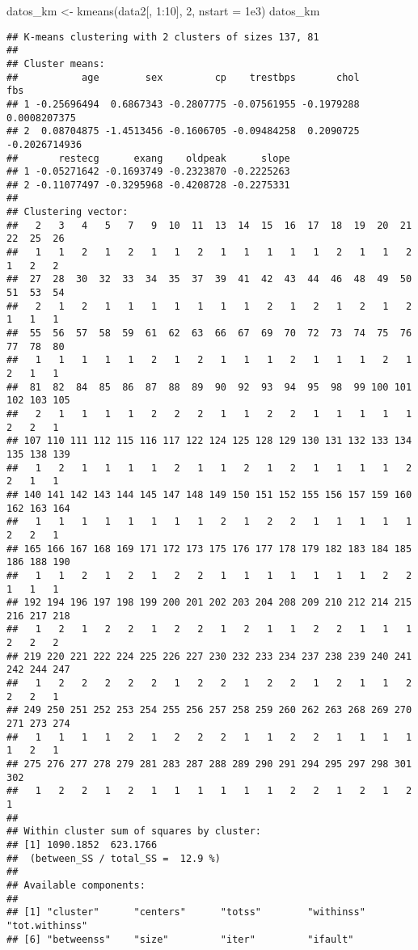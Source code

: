 \documentclass[
]{article}
\newenvironment{Shaded}{\begin{snugshade}}{\end{snugshade}}
\newcommand{\AttributeTok}[1]{\textcolor[rgb]{0.77,0.63,0.00}{#1}}
\newcommand{\DecValTok}[1]{\textcolor[rgb]{0.00,0.00,0.81}{#1}}
\newcommand{\FloatTok}[1]{\textcolor[rgb]{0.00,0.00,0.81}{#1}}
\newcommand{\FunctionTok}[1]{\textcolor[rgb]{0.00,0.00,0.00}{#1}}
\newcommand{\NormalTok}[1]{#1}
\newcommand{\OtherTok}[1]{\textcolor[rgb]{0.56,0.35,0.01}{#1}}
\newcommand{\SpecialCharTok}[1]{\textcolor[rgb]{0.00,0.00,0.00}{#1}}
\begin{document}
\begin{Shaded}
\begin{Highlighting}[]
\NormalTok{datos\_km }\OtherTok{\textless{}{-}} \FunctionTok{kmeans}\NormalTok{(data2[, }\DecValTok{1}\SpecialCharTok{:}\DecValTok{10}\NormalTok{], }\DecValTok{2}\NormalTok{, }\AttributeTok{nstart =} \FloatTok{1e3}\NormalTok{)}
\NormalTok{datos\_km}
\end{Highlighting}
\end{Shaded}

\begin{verbatim}
## K-means clustering with 2 clusters of sizes 137, 81
## 
## Cluster means:
##           age        sex         cp    trestbps       chol           fbs
## 1 -0.25696494  0.6867343 -0.2807775 -0.07561955 -0.1979288  0.0008207375
## 2  0.08704875 -1.4513456 -0.1606705 -0.09484258  0.2090725 -0.2026714936
##       restecg      exang    oldpeak      slope
## 1 -0.05271642 -0.1693749 -0.2323870 -0.2225263
## 2 -0.11077497 -0.3295968 -0.4208728 -0.2275331
## 
## Clustering vector:
##   2   3   4   5   7   9  10  11  13  14  15  16  17  18  19  20  21  22  25  26 
##   1   1   2   1   2   1   1   2   1   1   1   1   1   2   1   1   2   1   2   2 
##  27  28  30  32  33  34  35  37  39  41  42  43  44  46  48  49  50  51  53  54 
##   2   1   2   1   1   1   1   1   1   1   2   1   2   1   2   1   2   1   1   1 
##  55  56  57  58  59  61  62  63  66  67  69  70  72  73  74  75  76  77  78  80 
##   1   1   1   1   1   2   1   2   1   1   1   2   1   1   1   2   1   2   1   1 
##  81  82  84  85  86  87  88  89  90  92  93  94  95  98  99 100 101 102 103 105 
##   2   1   1   1   1   2   2   2   1   1   2   2   1   1   1   1   1   2   2   1 
## 107 110 111 112 115 116 117 122 124 125 128 129 130 131 132 133 134 135 138 139 
##   1   2   1   1   1   1   2   1   1   2   1   2   1   1   1   1   2   2   1   1 
## 140 141 142 143 144 145 147 148 149 150 151 152 155 156 157 159 160 162 163 164 
##   1   1   1   1   1   1   1   1   2   1   2   2   1   1   1   1   1   2   2   1 
## 165 166 167 168 169 171 172 173 175 176 177 178 179 182 183 184 185 186 188 190 
##   1   1   2   1   2   1   2   2   1   1   1   1   1   1   1   2   2   1   1   1 
## 192 194 196 197 198 199 200 201 202 203 204 208 209 210 212 214 215 216 217 218 
##   1   2   1   2   2   1   2   2   1   2   1   1   2   2   1   1   1   2   2   2 
## 219 220 221 222 224 225 226 227 230 232 233 234 237 238 239 240 241 242 244 247 
##   1   2   2   2   2   2   1   2   2   1   2   2   1   2   1   1   2   2   2   1 
## 249 250 251 252 253 254 255 256 257 258 259 260 262 263 268 269 270 271 273 274 
##   1   1   1   1   2   1   2   2   2   1   1   2   2   1   1   1   1   1   2   1 
## 275 276 277 278 279 281 283 287 288 289 290 291 294 295 297 298 301 302 
##   1   2   2   1   2   1   1   1   1   1   1   2   2   1   2   1   2   1 
## 
## Within cluster sum of squares by cluster:
## [1] 1090.1852  623.1766
##  (between_SS / total_SS =  12.9 %)
## 
## Available components:
## 
## [1] "cluster"      "centers"      "totss"        "withinss"     "tot.withinss"
## [6] "betweenss"    "size"         "iter"         "ifault"
\end{verbatim}
\end{document}
